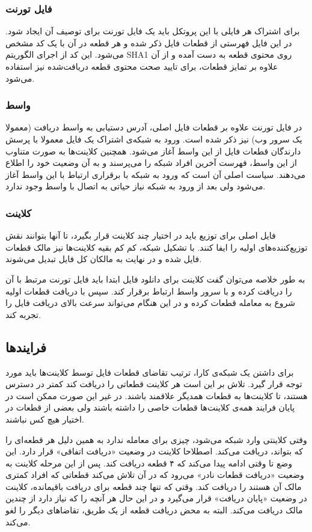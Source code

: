 \documentclass{report}
\begin{document}
\subsubsection{فایل تورنت}
برای اشتراک هر فایلی با این پروتکل باید یک فایل تورنت برای توصیف آن ایجاد شود. در این فایل فهرستی از قطعات فایل ذکر شده و هر قطعه در آن با یک کد مشخص می‌شود. این کد از اجرای الگوریتم SHA1 روی محتوی قطعه به دست آمده و از آن علاوه بر تمایز قطعات، برای تایید صحت محتوی قطعه دریافت‌شده نیز استفاده می‌شود.

\subsubsection{واسط}
در فایل تورنت علاوه بر قطعات فایل اصلی، آدرس دستیابی به واسط دریافت (معمولا یک سرور وب) نیز ذکر شده است. ورود به شبکه‌ی اشتراک یک فایل معمولا با پرسش دارندگان قطعات فایل از این واسط آغاز می‌شود. همچنین کلاینت‌ها به صورت متناوب از این واسط، فهرست آخرین افراد شبکه را می‌پرسند و به آن وضعیت خود را اطلاع می‌دهند. سیاست اصلی آن است که ورود به شبکه با برقراری ارتباط با این واسط آغاز می‌شود ولی بعد از ورود به شبکه نیاز حیاتی به اتصال با واسط وجود ندارد.

\subsubsection{کلاینت}
فایل اصلی برای توزیع باید در اختیار چند کلاینت قرار بگیرد، تا آنها بتوانند نقش توزیع‌کننده‌های اولیه را ایفا کنند. با تشکیل شبکه، کم کم بقیه کلاینت‌ها نیز مالک قطعات فایل شده و در نهایت به مالکان کل فایل تبدیل می‌شوند.

به طور خلاصه می‌توان گفت کلاینت برای دانلود فایل ابتدا باید فایل تورنت مرتبط با آن را دریافت کرده و با سرور واسط ارتباط برقرار کند. سپس با دریافت قطعات اولیه شروع به معامله قطعات کرده و در این هنگام می‌تواند سرعت بالای دریافت فایل را تجربه کند.

\subsection{فرایندها}
برای داشتن یک شبکه‌ی کارا، ترتیب تقاضای قطعات فایل توسط کلاینت‌ها باید مورد توجه قرار گیرد. تلاش بر این است هر کلاینت قطعاتی را دریافت کند کمتر در دسترس هستند، تا کلاینت‌ها به قطعات همدیگر علاقمند باشند. در غیر این صورت ممکن است در پایان فرایند همه‌ی کلاینت‌ها قطعات خاصی را داشته باشند ولی بعضی از قطعات در اختیار هیچ کس نباشند.

وقتی کلاینتی وارد شبکه می‌شود، چیزی برای معامله ندارد به همین دلیل هر قطعه‌ای را که بتواند، دریافت می‌کند. اصطلاحا کلاینت در وضعیت «دریافت اتفاقی» قرار دارد. این وضع تا وقتی ادامه پیدا می‌کند که ۴ قطعه دریافت کند. پس از این مرحله کلاینت به وضعیت «دریافت قطعات نادر» می‌رود که در آن تلاش می‌کند قطعاتی که افراد کمتری مالک آن هستند را دریافت کند. وقتی که تنها چند قطعه برای دریافت باقیمانده، کلاینت در وضعیت «پایان دریافت» قرار می‌گیرد و در این حال هر آنچه را که نیاز دارد از چندین مالک دریافت می‌کند. البته به محض دریافت قطعه از یک طریق، تقاضاهای دیگر را لغو می‌کند.
\end{document}
